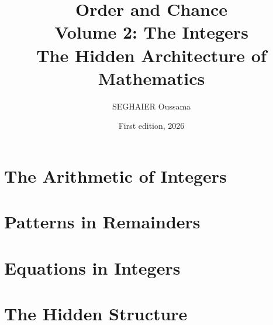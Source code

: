 \documentclass[11pt,openany]{book}
\title{\Huge\textbf{Order and Chance}\\[0.4em]\LARGE Volume 2: The Integers\\[0.6em]
\Large The Hidden Architecture of Mathematics}
\author{SEGHAIER Oussama}
\date{First edition, 2026}
\begin{document}
\frontmatter
\makecover
\maketitle

\tableofcontents

\mainmatter

\part{The Arithmetic of Integers}





\part{Patterns in Remainders}



\part{Equations in Integers}





\part{The Hidden Structure}


\backmatter




\end{document}

